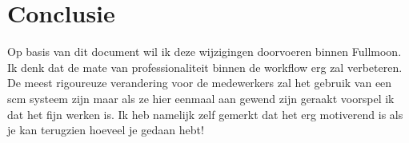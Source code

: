 \documentclass[12pt,a4paper]{article}
\begin{document}
  \section{Conclusie}
  
  Op basis van dit document wil ik deze wijzigingen doorvoeren binnen Fullmoon. Ik denk dat de mate van professionaliteit binnen de workflow erg zal verbeteren. De meest rigoureuze verandering voor de medewerkers zal het gebruik van een {\sc scm} systeem zijn maar als ze hier eenmaal aan gewend zijn geraakt voorspel ik dat het fijn werken is. Ik heb namelijk zelf gemerkt dat het erg motiverend is als je kan terugzien hoeveel je gedaan hebt!
\end{document}
